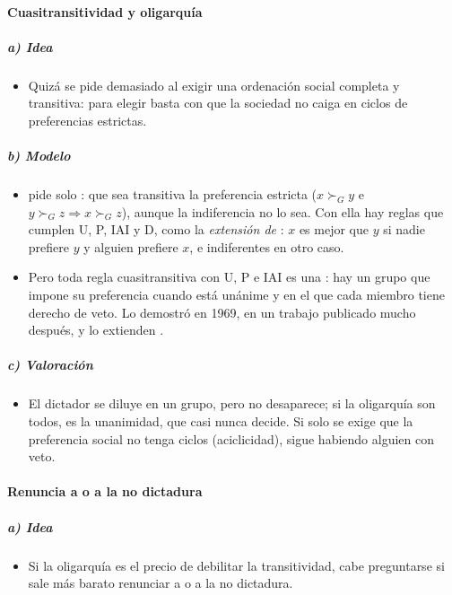 \documentclass[11pt]{article}
\begin{document}
\paragraph{Cuasitransitividad y oligarquía}

\subparagraph{a) Idea}

\begin{itemize}
\item Quizá se pide demasiado al exigir una ordenación social completa y transitiva: para elegir basta con que la sociedad no caiga en ciclos de preferencias estrictas.
\end{itemize}

\subparagraph{b) Modelo}

\begin{itemize}
\item \textcite{Sen1969Quasi} pide solo : que sea transitiva la preferencia estricta ($x\succ_Gy$ e $y\succ_Gz\Rightarrow x\succ_Gz$), aunque la indiferencia no lo sea. Con ella hay reglas que cumplen U, P, IAI y D, como la \emph{extensión de }: $x$ es mejor que $y$ si nadie prefiere $y$ y alguien prefiere $x$, e indiferentes en otro caso.
\item Pero toda regla cuasitransitiva con U, P e IAI es una : hay un grupo que impone su preferencia cuando está unánime y en el que cada miembro tiene derecho de veto. Lo demostró  en 1969, en un trabajo publicado mucho después\nocite{Gibbard2014Intransitive}, y lo extienden \textcite{MasColellSonnenschein1972General}.
\end{itemize}

\subparagraph{c) Valoración}

\begin{itemize}
\item El dictador se diluye en un grupo, pero no desaparece; si la oligarquía son todos, es la unanimidad, que casi nunca decide. Si solo se exige que la preferencia social no tenga ciclos (aciclicidad), sigue habiendo alguien con veto\nocite{Brown1975Aggregation}.
\end{itemize}

\paragraph{Renuncia a  o a la no dictadura}

\subparagraph{a) Idea}

\begin{itemize}
\item Si la oligarquía es el precio de debilitar la transitividad, cabe preguntarse si sale más barato renunciar a  o a la no dictadura.
\end{itemize}
\end{document}
